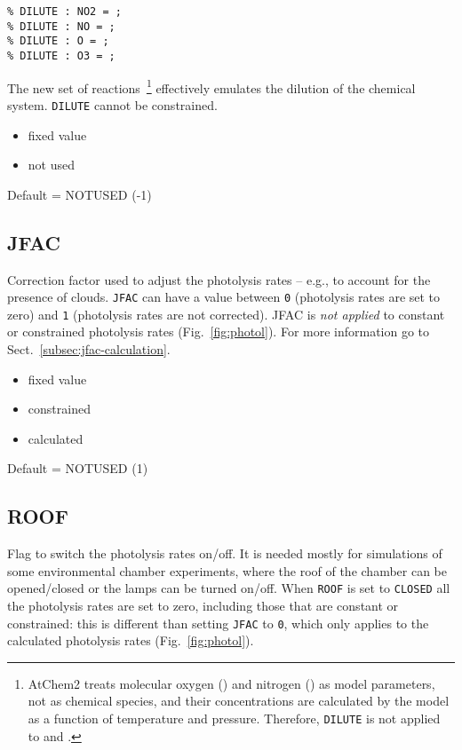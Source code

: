 \begin{verbatim}
% DILUTE : NO2 = ;
% DILUTE : NO = ;
% DILUTE : O = ;
% DILUTE : O3 = ;
\end{verbatim}

The new set of reactions~\footnote{AtChem2 treats molecular oxygen
  () and nitrogen () as model parameters, not as
  chemical species, and their concentrations are calculated by the
  model as a function of temperature and pressure. Therefore,
  \texttt{DILUTE} is not applied to  and .} effectively
emulates the dilution of the chemical system. \texttt{DILUTE} cannot
be constrained.

\begin{itemize}
\item fixed value
\item not used
\end{itemize}

Default = NOTUSED (-1)

\subsection{JFAC} \label{subsec:jfac}

Correction factor used to adjust the photolysis rates -- e.g., to
account for the presence of clouds. \texttt{JFAC} can have a value
between \texttt{0} (photolysis rates are set to zero) and \texttt{1}
(photolysis rates are not corrected). JFAC is \emph{not applied} to
constant or constrained photolysis rates (Fig.~\ref{fig:photol}). For
more information go to Sect.~\ref{subsec:jfac-calculation}.

\begin{itemize}
\item fixed value
\item constrained
\item calculated
\end{itemize}

Default = NOTUSED (1)

\subsection{ROOF} \label{subsec:roof}

Flag to switch the photolysis rates on/off. It is needed mostly for
simulations of some environmental chamber experiments, where the roof
of the chamber can be opened/closed or the lamps can be turned on/off.
When \texttt{ROOF} is set to \texttt{CLOSED} all the photolysis rates
are set to zero, including those that are constant or constrained:
this is different than setting \texttt{JFAC} to \texttt{0}, which only
applies to the calculated photolysis rates (Fig.~\ref{fig:photol}).

